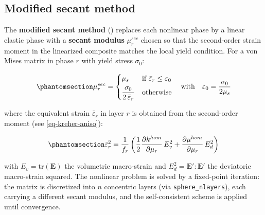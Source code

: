 \documentclass[
  a4paper,
  numbers=noendperiod,
  DIV=12]{scrreprt}
\newcommand{\uu}[1]{{\symbf{{#1}}}}
\begin{document}
\subsection{Modified secant method}\label{modified-secant-method}

The \textbf{modified secant method} () replaces each nonlinear phase by a linear elastic phase with a
\textbf{secant modulus} \(\mu^{sec}_r\) chosen so that the second-order
strain moment in the linearized composite matches the local yield
condition. For a von Mises matrix in phase \(r\) with yield stress
\(\sigma_0\):

\begin{equation}\protect\phantomsection\label{eq-secant-modulus}{
\mu^{sec}_r = \begin{cases}
\mu_s & \text{if } \bar{\varepsilon}_r \leq \varepsilon_0 \\[4pt]
\dfrac{\sigma_0}{2\,\bar{\varepsilon}_r} & \text{otherwise}
\end{cases}
\quad\text{with}\quad \varepsilon_0 = \dfrac{\sigma_0}{2\mu_s}
}\end{equation}

where the equivalent strain \(\bar{\varepsilon}_r\) in layer \(r\) is
obtained from the second-order moment (see \ref{eq-kreher-aniso}):

\begin{equation}\protect\phantomsection\label{eq-equivalent-strain}{
\bar{\varepsilon}_r^2 = \frac{1}{f_r}\left(\frac{1}{2}\frac{\partial k^{hom}}{\partial \mu_r}\,E_v^2 + \frac{\partial \mu^{hom}}{\partial \mu_r}\,E_d^2\right)
}\end{equation}

with \(E_v = \mathrm{tr}(\uu{E})\) the volumetric macro-strain and
\(E_d^2 = \uu{E}':\uu{E}'\) the deviatoric macro-strain squared. The
nonlinear problem is solved by a fixed-point iteration: the matrix is
discretized into \(n\) concentric layers (via \texttt{sphere\_nlayers}),
each carrying a different secant modulus, and the self-consistent scheme
is applied until convergence.
\end{document}
